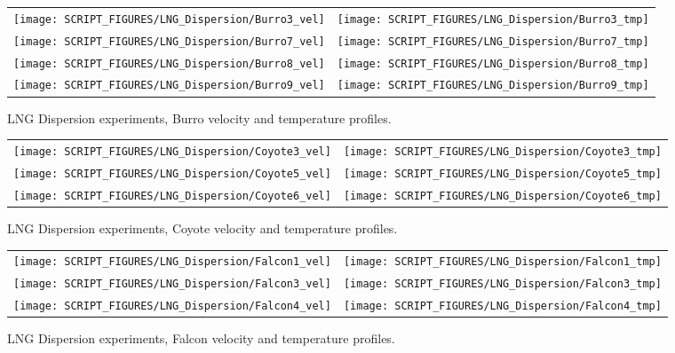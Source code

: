 \newpage

\begin{figure}[p]
\begin{tabular*}{\textwidth}{l@{\extracolsep{\fill}}r}
\texttt{[image: SCRIPT\_FIGURES/LNG\_Dispersion/Burro3\_vel]} &
\texttt{[image: SCRIPT\_FIGURES/LNG\_Dispersion/Burro3\_tmp]} \\
\texttt{[image: SCRIPT\_FIGURES/LNG\_Dispersion/Burro7\_vel]} &
\texttt{[image: SCRIPT\_FIGURES/LNG\_Dispersion/Burro7\_tmp]} \\
\texttt{[image: SCRIPT\_FIGURES/LNG\_Dispersion/Burro8\_vel]} &
\texttt{[image: SCRIPT\_FIGURES/LNG\_Dispersion/Burro8\_tmp]} \\
\texttt{[image: SCRIPT\_FIGURES/LNG\_Dispersion/Burro9\_vel]} &
\texttt{[image: SCRIPT\_FIGURES/LNG\_Dispersion/Burro9\_tmp]}
\end{tabular*}
\caption[LNG Dispersion experiments, Burro velocity and temperature profiles]{LNG Dispersion experiments, Burro velocity and temperature profiles.}
\label{LNG_Dispersion_Burro_profiles}
\end{figure}

\begin{figure}[p]
\begin{tabular*}{\textwidth}{l@{\extracolsep{\fill}}r}
\texttt{[image: SCRIPT\_FIGURES/LNG\_Dispersion/Coyote3\_vel]} &
\texttt{[image: SCRIPT\_FIGURES/LNG\_Dispersion/Coyote3\_tmp]} \\
\texttt{[image: SCRIPT\_FIGURES/LNG\_Dispersion/Coyote5\_vel]} &
\texttt{[image: SCRIPT\_FIGURES/LNG\_Dispersion/Coyote5\_tmp]} \\
\texttt{[image: SCRIPT\_FIGURES/LNG\_Dispersion/Coyote6\_vel]} &
\texttt{[image: SCRIPT\_FIGURES/LNG\_Dispersion/Coyote6\_tmp]}
\end{tabular*}
\caption[LNG Dispersion experiments, Coyote velocity and temperature profiles]{LNG Dispersion experiments, Coyote velocity and temperature profiles.}
\label{LNG_Dispersion_Coyote_profiles}
\end{figure}

\begin{figure}[p]
\begin{tabular*}{\textwidth}{l@{\extracolsep{\fill}}r}
\texttt{[image: SCRIPT\_FIGURES/LNG\_Dispersion/Falcon1\_vel]} &
\texttt{[image: SCRIPT\_FIGURES/LNG\_Dispersion/Falcon1\_tmp]} \\
\texttt{[image: SCRIPT\_FIGURES/LNG\_Dispersion/Falcon3\_vel]} &
\texttt{[image: SCRIPT\_FIGURES/LNG\_Dispersion/Falcon3\_tmp]} \\
\texttt{[image: SCRIPT\_FIGURES/LNG\_Dispersion/Falcon4\_vel]} &
\texttt{[image: SCRIPT\_FIGURES/LNG\_Dispersion/Falcon4\_tmp]}
\end{tabular*}
\caption[LNG Dispersion experiments, Falcon velocity and temperature profiles]{LNG Dispersion experiments, Falcon velocity and temperature profiles.}
\label{LNG_Dispersion_Falcon_profiles}
\end{figure}

